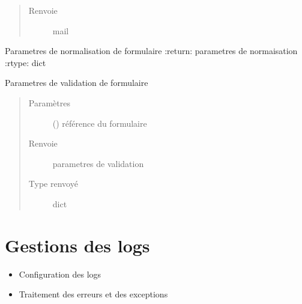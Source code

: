 \documentclass[letterpaper,10pt,french]{sphinxmanual}
\begin{document}
\begin{fulllineitems}
\begin{fulllineitems}
\begin{quote}
\begin{description}
\item[{Renvoie}] \leavevmode
mail

\end{description}\end{quote}

\end{fulllineitems}


\begin{fulllineitems}
\label{\detokenize{classes/cfgloader:toolbox.cfgmng.CFGBases.normalizor}}
Parametres de normalisation de formulaire
:return: parametres de normaisation
:rtype: dict

\end{fulllineitems}


\begin{fulllineitems}
\label{\detokenize{classes/cfgloader:toolbox.cfgmng.CFGBases.validator}}
Parametres de validation de formulaire
\begin{quote}\begin{description}
\item[{Paramètres}] \leavevmode
{} () \textendash{} référence du formulaire

\item[{Renvoie}] \leavevmode
parametres de validation

\item[{Type renvoyé}] \leavevmode
dict

\end{description}\end{quote}

\end{fulllineitems}


\end{fulllineitems}



\chapter{Gestions des logs}
\label{\detokenize{classes/cfgloader:gestions-des-logs}}\begin{itemize}
\item {} 
Configuration des logs

\item {} 
Traitement des erreurs et des exceptions

\end{itemize}
\end{document}
